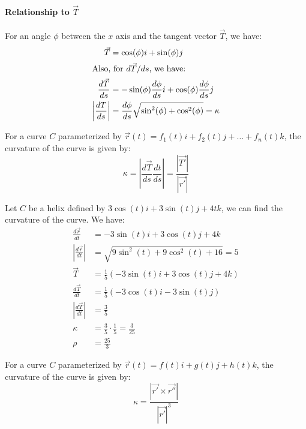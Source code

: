 \documentclass[11pt]{article}
\begin{document}
\paragraph{Relationship to $\vec{T}$} For an angle $\phi$ between the $x$ axis and the tangent vector $\vec{T}$, we have:
\begin{align}
    \vec{T} &= \cos(\phi)i + \sin(\phi)j \\
    \intertext{Also, for $d\vec{T}/ds$, we have:}
    \frac{d\vec{T}}{ds} &= -\sin(\phi)\frac{d\phi}{ds}i + \cos(\phi)\frac{d\phi}{ds}j \nonumber \\
    \left|\frac{d T}{ds}\right| &= \frac{d\phi }{ds} \sqrt{\sin^2 (\phi) + \cos^2 (\phi)} = \kappa \\
\end{align}
\begin{definition}
    For a curve $C$ parameterized by $\vec{r}(t) = f_1(t)i + f_2(t)j + \ldots + f_n(t)k$, the curvature of the curve is given by:
    \begin{equation}
        \kappa = \left| \frac{d\vec{T}}{ds} \frac{dt}{ds} \right| = \frac{|\vec{T'}|}{|\vec{r'}|} 
    \end{equation}
\end{definition}
\begin{example}[Helix]
    Let $C$ be a helix defined by $3\cos(t)i + 3\sin(t)j + 4tk$, we can find the curvature of the curve. We have:
    \begin{align*}
        \frac{d\vec{r}}{dt} &= -3\sin(t)i + 3\cos(t)j + 4k \\
        |\frac{d\vec{r}}{dt}| &= \sqrt{9\sin^2(t) + 9\cos^2(t) + 16} = 5 \\
        \vec{T} &= \frac{1}{5}(-3\sin(t)i + 3\cos(t)j + 4k) \\
        \frac{d\vec{T}}{dt} &= \frac{1}{5}(-3\cos(t)i - 3\sin(t)j) \\
        |\frac{d\vec{T}}{dt}| &= \frac{3}{5} \\
        \kappa &= \frac{3}{5} \cdot \frac{1}{5} = \frac{3}{25} \\
        \rho &= \frac{25}{3}
    \end{align*}
\end{example}
\begin{definition}
    For a curve $C$ parameterized by $\vec{r}(t) = f(t)i + g(t)j + h(t)k$, the curvature of the curve is given by:
    \begin{equation}
        \kappa = \frac{|\vec{r'} \times \vec{r''}|}{|\vec{r'}|^3}
    \end{equation}
\end{definition}
\end{document}
